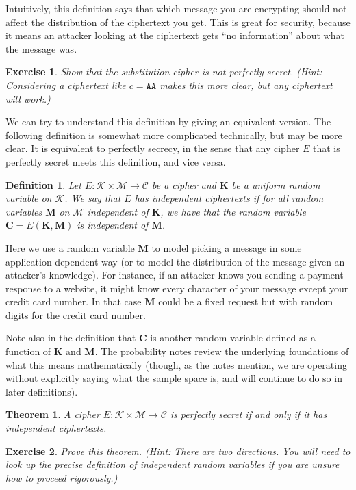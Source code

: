 \documentclass[11pt]{article}
\newtheorem{exercise}{Exercise}
\newtheorem{theorem}{Theorem}
\newtheorem{definition}{Definition}
\newcommand{\msgs}{\mathcal{M}}
\newcommand{\ctxts}{\mathcal{C}}
\newcommand{\keys}{\mathcal{K}}
\newcommand{\enc}{E}
\newcommand{\bK}{\mathbf{K}}
\newcommand{\bM}{\mathbf{M}}
\newcommand{\bC}{\mathbf{C}}
\begin{document}
Intuitively, this definition says that which message you are encrypting
should not affect the distribution of the ciphertext you get. This is great
for security, because it means an attacker looking at the ciphertext gets
``no information'' about what the message was.

\begin{exercise}
    Show that the substitution cipher is not perfectly secret.  (Hint:
    Considering a ciphertext like $c=\mathtt{AA}$ makes this more clear, but
    any ciphertext will work.)
\end{exercise}

We can try to understand this definition by giving an equivalent version.
The following definition is somewhat more complicated technically, but may
be more clear. It is equivalent to perfectly secrecy, in the sense that
any cipher $E$ that is perfectly secret meets this definition, and vice versa.
\begin{definition} 
    Let $\enc : \keys\times\msgs \to \ctxts$ be a cipher and $\bK$ be a uniform
    random variable on $\keys$.  We say that $\enc$ has \emph{independent
    ciphertexts} if for all random variables $\bM$ on $\msgs$ independent of
    $\bK$, we have that the random variable $\bC = \enc(\bK,\bM)$ is
    independent of $\bM$.
\end{definition}
Here we use a random variable $\bM$ to model picking a message
in some application-dependent way (or to model the distribution of the message
given an attacker's knowledge). For instance, if an attacker knows you
sending a payment response to a website, it might know every character of your
message except your credit card number. In that case $\bM$ could be a fixed
request but with random digits for the credit card number.

Note also in the definition that $\bC$ is another random variable defined as a
function of $\bK$ and $\bM$. The probability notes review the underlying
foundations of what this means mathematically (though, as the notes mention, we
are operating without explicitly saying what the sample space is, and will
continue to do so in later definitions).


\begin{theorem}
    A cipher $\enc : \keys\times\msgs \to \ctxts$ is perfectly secret
    if and only if it has independent ciphertexts.
\end{theorem}

\begin{exercise}
    Prove this theorem. (Hint: There are two directions. You will need
    to look up the precise definition of independent random variables
    if you are unsure how to proceed rigorously.)
\end{exercise}
\end{document}
